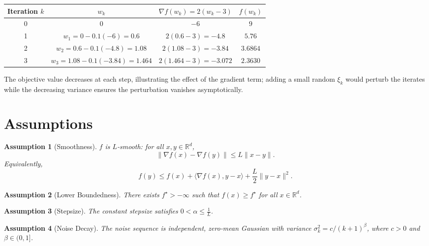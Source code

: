 \documentclass[11pt]{article}
\newtheorem{assumption}{Assumption}
\newcommand{\R}{\mathbb{R}}
\begin{document}
\begin{center}
\begin{tabular}{c|c|c|c}
Iteration $k$ & $w_{k}$ & $\nabla f(w_{k})=2(w_{k}-3)$ & $f(w_{k})$\\ \hline
0 & $0$ & $-6$ & $9$\\
1 & $w_{1}=0-0.1(-6)=0.6$ & $2(0.6-3)=-4.8$ & $5.76$\\
2 & $w_{2}=0.6-0.1(-4.8)=1.08$ & $2(1.08-3)=-3.84$ & $3.6864$\\
3 & $w_{3}=1.08-0.1(-3.84)=1.464$ & $2(1.464-3)=-3.072$ & $2.3630$\\
\end{tabular}
\end{center}
The objective value decreases at each step, illustrating the effect of the gradient term; adding a small random $\xi_{k}$ would perturb the iterates while the decreasing variance ensures the perturbation vanishes asymptotically.

\newpage

\section*{Assumptions}
\begin{assumption}[Smoothness]\label{ass:smooth}
$f$ is $L$‑smooth: for all $x,y\in\R^{d}$,
\[
\|\nabla f(x)-\nabla f(y)\| \le L\|x-y\|.
\]
Equivalently,
\[
f(y)\le f(x)+\langle\nabla f(x),y-x\rangle+\frac{L}{2}\|y-x\|^{2}.
\]
\end{assumption}
\begin{assumption}[Lower Boundedness]\label{ass:lb}
There exists $f^{\star}>-\infty$ such that $f(x)\ge f^{\star}$ for all $x\in\R^{d}$.
\end{assumption}
\begin{assumption}[Stepsize]\label{ass:step}
The constant stepsize satisfies $0<\alpha\le \frac{1}{L}$.
\end{assumption}
\begin{assumption}[Noise Decay]\label{ass:noise}
The noise sequence is independent, zero‑mean Gaussian with variance $\sigma_{k}^{2}=c/(k+1)^{\beta}$, where $c>0$ and $\beta\in(0,1]$.
\end{assumption}
\end{document}
